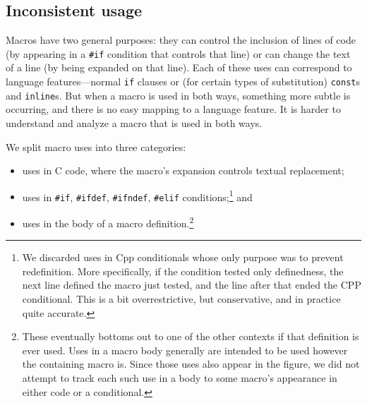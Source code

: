 \documentclass[10pt]{article}
\begin{document}
\subsection{Inconsistent usage}

Macros have two general purposes: they can control the inclusion of
lines of code (by appearing in a \texttt{\#if} condition that controls
that line) or can change the text of a line (by being expanded on that
line).  Each of these uses can correspond to language features---normal
\texttt{if} clauses or (for certain types of substitution) {\tt const}s
and {\tt inline}s.  But when a macro is used in both ways, something
more subtle is occurring, and there is
no easy mapping to a language feature.  It is harder to understand
and analyze a macro that is used in both ways.

We split macro uses into three categories:
\begin{itemize}
\item uses in C code, where the macro's expansion controls textual
      replacement; 
\item uses in \texttt{\#if}, \texttt{\#ifdef}, \texttt{\#ifndef},
      \texttt{\#elif} conditions;\footnote{We discarded uses in Cpp
        conditionals whose only purpose was to prevent redefinition.
        More specifically, if the condition tested only definedness, the
        next line defined the macro just tested, and the line after that
        ended the CPP conditional.  This is a bit overrestrictive, but
        conservative, and in practice quite accurate.} and
\item uses in the body of a macro definition.\footnote{These eventually
        bottoms out to one of the other contexts if that definition is
        ever used.  Uses in a macro body generally are intended to be
        used however the containing macro is.  Since those uses also
        appear in the figure, we did not attempt to track each such use
        in a body to some macro's appearance in either code or a
        conditional.}
\end{itemize}

%
\end{document}
